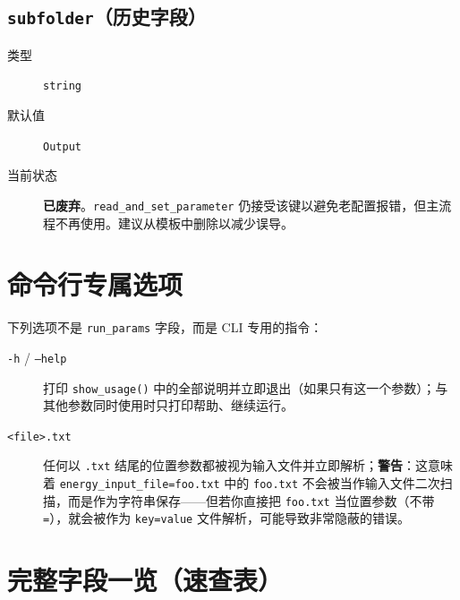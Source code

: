 \subsection{\texttt{subfolder}（历史字段）}

\begin{description}
  \item[类型] \texttt{string}
  \item[默认值] \texttt{Output}
  \item[当前状态] \textbf{已废弃}。\texttt{read\_and\_set\_parameter} 仍接受该键以避免老配置报错，但主流程不再使用。建议从模板中删除以减少误导。
\end{description}

\section{命令行专属选项}
\label{sec:appE_cli_only}

下列选项不是 \texttt{run\_params} 字段，而是 CLI 专用的指令：

\begin{description}
  \item[\texttt{-h} / \texttt{--help}] 打印 \texttt{show\_usage()} 中的全部说明并立即退出（如果只有这一个参数）；与其他参数同时使用时只打印帮助、继续运行。
  \item[\texttt{<file>.txt}] 任何以 \texttt{.txt} 结尾的位置参数都被视为输入文件并立即解析；\textbf{警告}：这意味着 \texttt{energy\_input\_file=foo.txt} 中的 \texttt{foo.txt} 不会被当作输入文件二次扫描，而是作为字符串保存——但若你直接把 \texttt{foo.txt} 当位置参数（不带 \texttt{=}），就会被作为 \texttt{key=value} 文件解析，可能导致非常隐蔽的错误。
\end{description}

\section{完整字段一览（速查表）}
\label{sec:appE_quick_ref}

